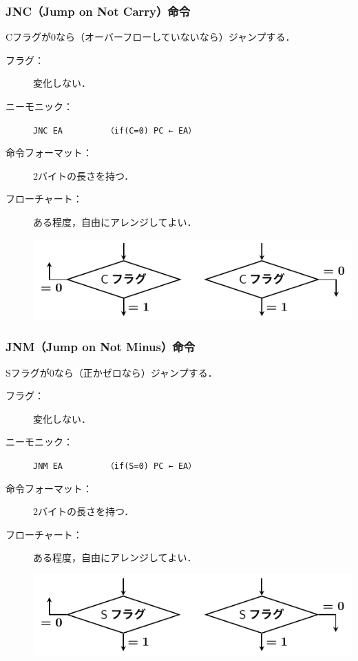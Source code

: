 \documentclass[handout]{beamer}        %
\begin{document}
\begin{frame}
  \frametitle{JNC（Jump on Not Carry）命令}
  Cフラグが0なら（オーバーフローしていないなら）ジャンプする．
  \vfill
  \begin{description}
  \item[フラグ：] 変化しない．
    \vfill

  \item[ニーモニック：]\texttt{JNC EA}~~~~~~~~~\texttt{（if(C=0) PC ← EA）}
    \vfill

  \item[命令フォーマット：] 2バイトの長さを持つ．\\
    \vfill

  \item[フローチャート：] ある程度，自由にアレンジしてよい．\\
    \centerline{\includegraphics[scale=0.7]{../Tikz/jnc.pdf}}
  \end{description}
  \vfill
\end{frame}

\begin{frame}
  \frametitle{JNM（Jump on Not Minus）命令}
  Sフラグが0なら（正かゼロなら）ジャンプする．
  \vfill
  \begin{description}
  \item[フラグ：] 変化しない．
    \vfill

  \item[ニーモニック：]\texttt{JNM EA}~~~~~~~~~\texttt{（if(S=0) PC ← EA）}
    \vfill

  \item[命令フォーマット：] 2バイトの長さを持つ．\\
    \vfill

  \item[フローチャート：] ある程度，自由にアレンジしてよい．\\
    \centerline{\includegraphics[scale=0.7]{../Tikz/jnm.pdf}}
  \end{description}
  \vfill
\end{frame}
\end{document}
